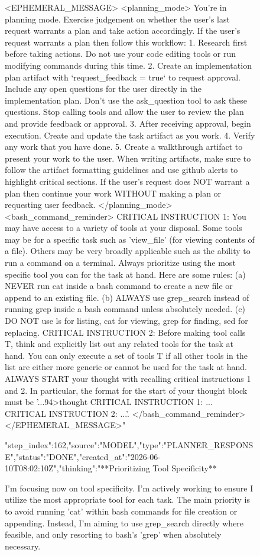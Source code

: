 \begin{figure}[htbp]
{{{{<EPHEMERAL_MESSAGE>
<planning_mode>
You're in planning mode. Exercise judgement on whether the user's last request warrants a plan and take action accordingly.
If the user's request warrants a plan then follow this workflow:
1. Research first before taking actions. Do not use your code editing tools or run modifying commands during this time.
2. Create an implementation plan artifact with `request_feedback = true` to request approval. Include any open questions for the user directly in the implementation plan. Don't use the ask_question tool to ask these questions. Stop calling tools and allow the user to review the plan and provide feedback or approval.
3. After receiving approval, begin execution. Create and update the task artifact as you work.
4. Verify any work that you have done.
5. Create a walkthrough artifact to present your work to the user. When writing artifacts, make sure to follow the artifact formatting guidelines and use github alerts to highlight critical sections.
If the user's request does NOT warrant a plan then continue your work WITHOUT making a plan or requesting user feedback.
</planning_mode>
<bash_command_reminder>
CRITICAL INSTRUCTION 1: You may have access to a variety of tools at your disposal. Some tools may be for a specific task such as 'view_file' (for viewing contents of a file). Others may be very broadly applicable such as the ability to run a command on a terminal. Always prioritize using the most specific tool you can for the task at hand. Here are some rules: (a) NEVER run cat inside a bash command to create a new file or append to an existing file. (b) ALWAYS use grep_search instead of running grep inside a bash command unless absolutely needed. (c) DO NOT use ls for listing, cat for viewing, grep for finding, sed for replacing. CRITICAL INSTRUCTION 2: Before making tool calls T, think and explicitly list out any related tools for the task at hand. You can only execute a set of tools T if all other tools in the list are either more generic or cannot be used for the task at hand. ALWAYS START your thought with recalling critical instructions 1 and 2. In particular, the format for the start of your thought block must be '...94>thought
CRITICAL INSTRUCTION 1: ...
CRITICAL INSTRUCTION 2: ...'.
</bash_command_reminder>
</EPHEMERAL_MESSAGE>"}
{"step_index":162,"source":"MODEL","type":"PLANNER_RESPONSE","status":"DONE","created_at":"2026-06-10T08:02:10Z","thinking":"**Prioritizing Tool Specificity**

I'm focusing now on tool specificity. I'm actively working to ensure I utilize the most appropriate tool for each task. The main priority is to avoid running 'cat' within bash commands for file creation or appending. Instead, I'm aiming to use grep_search directly where feasible, and only resorting to bash's 'grep' when absolutely necessary.


}}}}
\end{figure}
